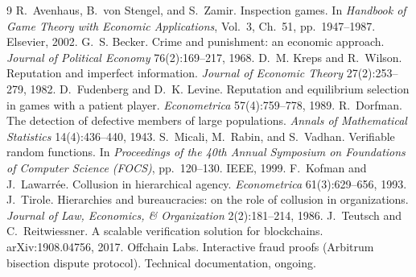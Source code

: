\documentclass[11pt,a4paper]{article}
\begin{document}
\begin{thebibliography}{9}
 R.~Avenhaus, B.~von Stengel, and S.~Zamir. Inspection games. In \emph{Handbook of Game Theory with Economic Applications}, Vol.~3, Ch.~51, pp.~1947--1987. Elsevier, 2002.
 G.~S. Becker. Crime and punishment: an economic approach. \emph{Journal of Political Economy} 76(2):169--217, 1968.
 D.~M. Kreps and R.~Wilson. Reputation and imperfect information. \emph{Journal of Economic Theory} 27(2):253--279, 1982.
 D.~Fudenberg and D.~K. Levine. Reputation and equilibrium selection in games with a patient player. \emph{Econometrica} 57(4):759--778, 1989.
 R.~Dorfman. The detection of defective members of large populations. \emph{Annals of Mathematical Statistics} 14(4):436--440, 1943.
 S.~Micali, M.~Rabin, and S.~Vadhan. Verifiable random functions. In \emph{Proceedings of the 40th Annual Symposium on Foundations of Computer Science (FOCS)}, pp.~120--130. IEEE, 1999.
 F.~Kofman and J.~Lawarrée. Collusion in hierarchical agency. \emph{Econometrica} 61(3):629--656, 1993.
 J.~Tirole. Hierarchies and bureaucracies: on the role of collusion in organizations. \emph{Journal of Law, Economics, \& Organization} 2(2):181--214, 1986.
 J.~Teutsch and C.~Reitwiessner. A scalable verification solution for blockchains. arXiv:1908.04756, 2017.
 Offchain Labs. Interactive fraud proofs (Arbitrum bisection dispute protocol). Technical documentation, ongoing.
\end{thebibliography}
\end{document}
